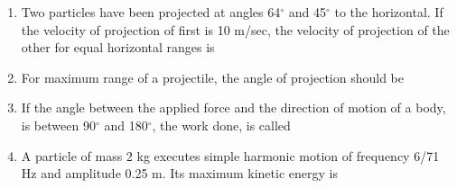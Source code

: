\documentclass[11pt,a4paper]{article}
\begin{document}
\begin{enumerate}
\item{Two particles have been projected at angles 64$^\circ$ and 45$^\circ$ to the horizontal. If the velocity of projection of first is 10 m/sec, the velocity of projection of the other for equal horizontal ranges is
}
\\
\item{For maximum range of a projectile, the angle of projection should be}
\\
\item{If the angle between the applied force and the direction of motion of a body, is between 90$^\circ$ and 180$^\circ$, the work done, is called
}
\\
\item{A particle of mass 2 kg executes simple harmonic motion of frequency 6/71 Hz and amplitude 0.25 m. Its maximum kinetic energy is}
\\\begin{enumerate*}[itemjoin=\qquad, label=\Alph*.]

\end{enumerate*}
\end{enumerate}
\end{document}
